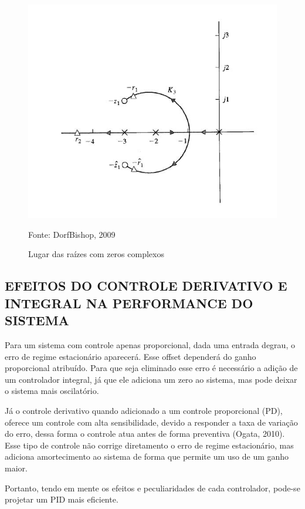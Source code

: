 \documentclass[a4paper,12pt]{article}
\begin{document}
\begin{figure}[!h]
\centering
\includegraphics[scale=1]{lugar-das-raizes-pid.JPG}
\caption{Lugar das raízes com zeros complexos}
\label{fig:lgr}
{Fonte: DorfBishop, 2009}
\end{figure}


\subsection{EFEITOS DO CONTROLE DERIVATIVO E INTEGRAL NA PERFORMANCE DO SISTEMA}
\hspace{4ex}
Para um sistema com controle apenas proporcional, dada uma entrada degrau, o erro de regime estacionário aparecerá. Esse offset dependerá do ganho proporcional atribuído. Para que seja eliminado esse erro é necessário a adição de um controlador integral, já que ele adiciona um zero ao sistema, mas pode deixar o sistema mais oscilatório.

Já o controle derivativo quando adicionado a um controle proporcional (PD), oferece um controle com alta sensibilidade, devido a responder a taxa de variação do erro, dessa forma o controle atua antes de forma preventiva (Ogata, 2010). Esse tipo de controle não corrige diretamento o erro de regime estacionário, mas adiciona amortecimento ao sistema de forma que permite um uso de um ganho maior.

Portanto, tendo em mente os efeitos e peculiaridades de cada controlador, pode-se projetar um PID mais eficiente.
\newpage
\end{document}
